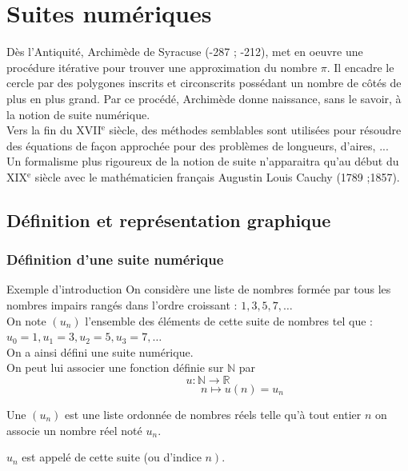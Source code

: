 \chapter{Suites numériques}
\thispagestyle{fancy}

Dès l'Antiquité, Archimède de Syracuse (-287 ; -212), met en oeuvre une procédure itérative pour trouver une approximation du nombre $\pi$. Il encadre le cercle par des polygones inscrits et circonscrits possédant un nombre de côtés de plus en plus grand. Par ce procédé,
Archimède donne naissance, sans le savoir, à la notion de suite numérique.\\
Vers la fin du XVII$^\text{e}$ siècle, des méthodes semblables sont utilisées pour résoudre des équations de façon approchée pour des problèmes de longueurs, d'aires, ...\\
Un formalisme plus rigoureux de la notion de suite n'apparaitra qu'au début du XIX$^\text{e}$ siècle avec le mathématicien français Augustin Louis Cauchy (1789 ;1857).

\section{Définition et représentation graphique}

\subsection{Définition d'une suite numérique}

\begin{exempleTitre}{Exemple d'introduction}
On considère une liste de nombres formée par tous les nombres impairs rangés dans l'ordre croissant : $1,3,5,7, \ldots$\\
On note $\left(u_{n}\right)$ l'ensemble des éléments de cette suite de nombres tel que :\\
$u_{0}=1, u_{1}=3, u_{2}=5, u_{3}=7, \ldots$\\
On a ainsi défini une suite numérique.\\
On peut lui associer une fonction définie sur $\mathbb{N}$ par 
$$u: \mathbb{N} \rightarrow \mathbb{R}$$
$$\phantom{......................}n \mapsto u(n)=u_{n}$$

\end{exempleTitre}

\begin{definitions}
\begin{itemDef}
\item Une  $\left(u_{n}\right)$ est une liste ordonnée de nombres réels telle qu'à tout entier $n$ on associe un nombre réel noté $u_{n}$.
\item $u_{n}$ est appelé  de cette suite (ou d'indice $\left.n\right)$.
\end{itemDef}
\end{definitions}

